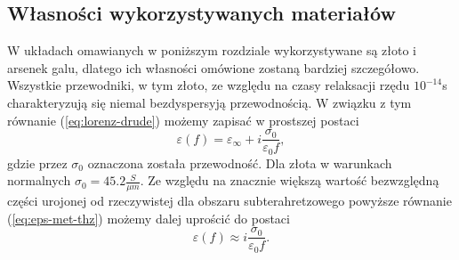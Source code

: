 \subsection{Własności wykorzystywanych materiałów}
W układach omawianych w poniższym rozdziale wykorzystywane są złoto i arsenek galu, dlatego ich własności omówione zostaną bardziej szczegółowo. Wszystkie przewodniki, w tym złoto, ze względu na czasy relaksacji rzędu $10^{-14}$s charakteryzują się niemal bezdyspersyją przewodnością. W związku z tym równanie (\ref{eq:lorenz-drude}) możemy zapisać w prostszej postaci
\begin{equation}
	\varepsilon(f)=\varepsilon_{\infty}+i \frac{\sigma_0}{\varepsilon_0 f},
	\label{eq:eps-met-thz}
\end{equation}
gdzie przez $\sigma_0$ oznaczona została przewodność. Dla złota w warunkach normalnych $\sigma_0=45.2 \frac{S}{\mu m}$.   Ze względu na znacznie większą wartość bezwzględną części urojonej od rzeczywistej dla obszaru subterahretzowego powyższe równanie (\ref{eq:eps-met-thz}) możemy dalej uprościć do postaci
\begin{equation}
	\varepsilon(f) \approx i \frac{\sigma_0}{\varepsilon_0 f}.
	\label{eq:eps-met-thz-app}
\end{equation}

